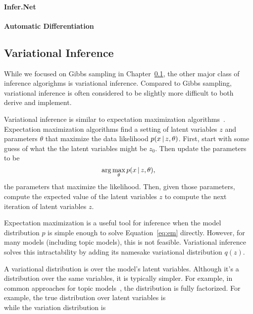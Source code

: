 \paragraph{Infer.Net}



\paragraph{Automatic Differentiation}



\subsection{Variational Inference}

While we focused on Gibbs sampling in Chapter~\ref{}, the other major
class of inference algorighms is variational inference.  Compared to
Gibbs sampling, variational inference is often considered to be
slightly more difficult to both derive and implement.

Variational inference is similar to expectation maximization
algorithms~\cite{}.  Expectation maximization algorithms find a
setting of latent variables $z$ and parameters $\theta$ that maximize
the data likelihood $p(x \, | \, z, \theta)$.  First, start with some guess
of what the the latent variables might be $z_0$.  Then update the
parameters to be
\begin{equation}
  \arg \max_{\theta} p(x \, | \, z, \theta),
\label{eq:em}
\end{equation}
the parameters that maximize the likelihood.  Then, given those
parameters, compute the expected value of the latent variables $z$ to
compute the next iteration of latent variables $z$.

Expectation maximization is a useful tool for inference when the model
distribution $p$ is simple enough to solve Equation~\ref{eq:em}
directly.  However, for many models (including topic models), this is
not feasible.  Variational inference solves this intractability by
adding its namesake variational distribution $q(z)$.

A variational distribution is over the model's latent variables.
Although it's a distribution over the same variables, it is typically
simpler.  For example, in common approaches for topic models~\citep{}, the
distribution is fully factorized.  For example, the true distribution
over latent variables is
\begin{equation}

\end{equation}
while the variation distribution is
\begin{equation}

\end{equation}

